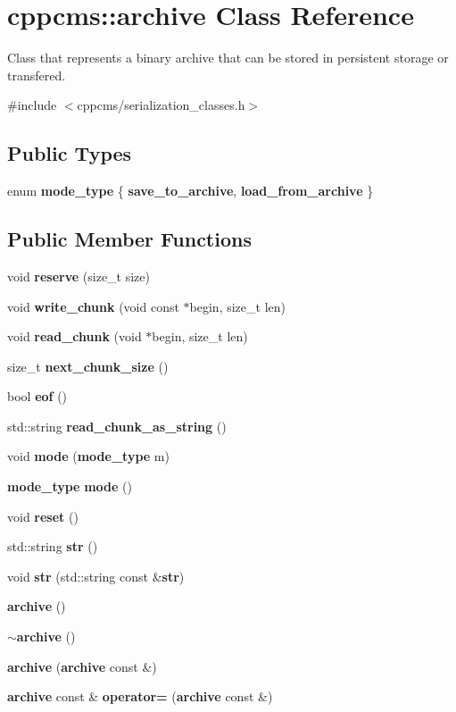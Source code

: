 \section{cppcms\-:\-:archive \-Class \-Reference}
\label{classcppcms_1_1archive}


\-Class that represents a binary archive that can be stored in persistent storage or transfered.  




{\ttfamily \#include $<$cppcms/serialization\-\_\-classes.\-h$>$}

\subsection*{\-Public \-Types}
\begin{DoxyCompactItemize}
\item 
enum {\bf mode\-\_\-type} \{ {\bfseries save\-\_\-to\-\_\-archive}, 
{\bfseries load\-\_\-from\-\_\-archive}
 \}
\end{DoxyCompactItemize}
\subsection*{\-Public \-Member \-Functions}
\begin{DoxyCompactItemize}
\item 
void {\bf reserve} (size\-\_\-t size)
\item 
void {\bf write\-\_\-chunk} (void const $\ast$begin, size\-\_\-t len)
\item 
void {\bf read\-\_\-chunk} (void $\ast$begin, size\-\_\-t len)
\item 
size\-\_\-t {\bf next\-\_\-chunk\-\_\-size} ()
\item 
bool {\bf eof} ()
\item 
std\-::string {\bf read\-\_\-chunk\-\_\-as\-\_\-string} ()
\item 
void {\bf mode} ({\bf mode\-\_\-type} m)
\item 
{\bf mode\-\_\-type} {\bf mode} ()
\item 
void {\bf reset} ()
\item 
std\-::string {\bf str} ()
\item 
void {\bf str} (std\-::string const \&{\bf str})
\item 
{\bf archive} ()
\item 
{\bf $\sim$archive} ()
\item 
{\bf archive} ({\bf archive} const \&)
\item 
{\bf archive} const \& {\bf operator=} ({\bf archive} const \&)
\end{DoxyCompactItemize}


